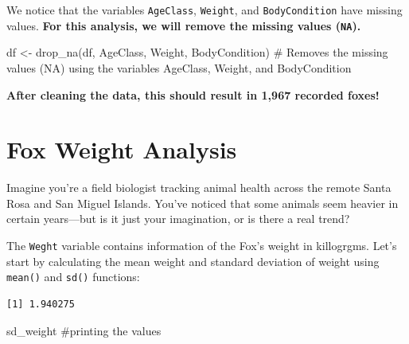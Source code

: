 \documentclass[
  letterpaper,
]{report}
\newenvironment{Shaded}{\begin{snugshade}}{\end{snugshade}}
\newcommand{\CommentTok}[1]{\textcolor[rgb]{0.37,0.37,0.37}{#1}}
\newcommand{\FunctionTok}[1]{\textcolor[rgb]{0.28,0.35,0.67}{#1}}
\newcommand{\NormalTok}[1]{\textcolor[rgb]{0.00,0.23,0.31}{#1}}
\newcommand{\OtherTok}[1]{\textcolor[rgb]{0.00,0.23,0.31}{#1}}
\newcommand{\SpecialCharTok}[1]{\textcolor[rgb]{0.37,0.37,0.37}{#1}}
\begin{document}
We notice that the variables \texttt{AgeClass}, \texttt{Weight}, and
\texttt{BodyCondition} have missing values. \textbf{For this analysis,
we will remove the missing values (\texttt{NA}).}

\begin{Shaded}
\begin{Highlighting}[]
\NormalTok{df }\OtherTok{\textless{}{-}} \FunctionTok{drop\_na}\NormalTok{(df, AgeClass, Weight, BodyCondition) }\CommentTok{\# Removes the missing values (NA) using the variables AgeClass, Weight, and BodyCondition}
\end{Highlighting}
\end{Shaded}

\textbf{After cleaning the data, this should result in 1,967 recorded
foxes!}

\section{Fox Weight Analysis}\label{fox-weight}

Imagine you're a field biologist tracking animal health across the
remote Santa Rosa and San Miguel Islands. You've noticed that some
animals seem heavier in certain years---but is it just your imagination,
or is there a real trend?

The \texttt{Weght} variable contains information of the Fox's weight in
killogrgms. Let's start by calculating the mean weight and standard
deviation of weight using \texttt{mean()} and \texttt{sd()} functions:

\begin{Shaded}
\end{Shaded}

\begin{verbatim}
[1] 1.940275
\end{verbatim}

\begin{Shaded}
\begin{Highlighting}[]
\NormalTok{sd\_weight }\CommentTok{\#printing the values}
\end{Highlighting}
\end{Shaded}
\end{document}
